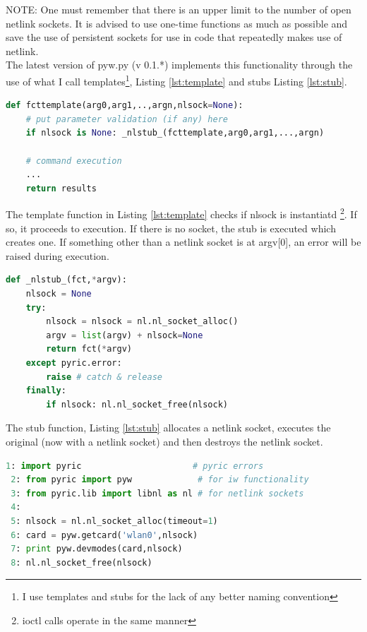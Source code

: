 \documentclass[11pt]{article}
\begin{document}
NOTE: One must remember that there is an upper limit to the number of open netlink
sockets. It is advised to use one-time functions as much as possible and save the
use of persistent sockets for use in code that repeatedly makes use of netlink. \\

The latest version of pyw.py (v 0.1.*) implements this functionality through the 
use of what I call templates\footnote{I use templates and stubs for the lack
of any better naming convention}, Listing \ref{lst:template} and stubs Listing 
\ref{lst:stub}.

\begin{lstlisting}[caption={A Basic Netlink Function Template},
                   label={lst:template},
                   language=Python]
def fcttemplate(arg0,arg1,..,argn,nlsock=None):
    # put parameter validation (if any) here
	if nlsock is None: _nlstub_(fcttemplate,arg0,arg1,...,argn)     

    # command execution
    ...
    return results
\end{lstlisting}

The template function in Listing \ref{lst:template} checks if nlsock is instantiatd
\footnote{ioctl calls operate in the same manner}. If so, it proceeds to execution.
If there is no socket, the stub is executed which creates one. If something other
than a netlink socket is at argv[0], an error will be raised during execution. \\

\begin{lstlisting}[caption={Function \_nlstub\_},
                   label={lst:stub},
                   language=Python]
def _nlstub_(fct,*argv):
    nlsock = None
    try:
        nlsock = nlsock = nl.nl_socket_alloc()
        argv = list(argv) + nlsock=None
        return fct(*argv)
    except pyric.error: 
        raise # catch & release
    finally:
        if nlsock: nl.nl_socket_free(nlsock)
\end{lstlisting}

The stub function, Listing \ref{lst:stub} allocates a netlink socket, executes
the original (now with a netlink socket) and then destroys the netlink socket.\\

\begin{lstlisting}[caption={Using Persistent Sockets},
                   label={lst:persistent},
                   language=Python]
 1: import pyric                      # pyric errors
 2: from pyric import pyw             # for iw functionality
 3: from pyric.lib import libnl as nl # for netlink sockets
 4:
 5: nlsock = nl.nl_socket_alloc(timeout=1)
 6: card = pyw.getcard('wlan0',nlsock)
 7: print pyw.devmodes(card,nlsock)
 8: nl.nl_socket_free(nlsock)
\end{lstlisting}
\end{document}
